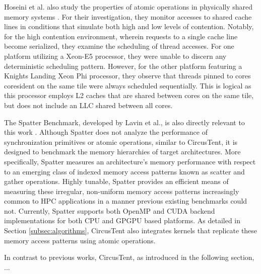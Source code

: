 Hoseini et al. also study the properties of atomic operations in physically shared memory systems \cite{hoseini2019modeling}.
For their investigation, they monitor accesses to shared cache lines in conditions that simulate both high and low levels of contention.
Notably, for the high contention environment, wherein requests to a single cache line become serialized, they examine the scheduling of thread accesses.
For one platform utilizing a Xeon-E5 processor, they were unable to discern any deterministic scheduling pattern.
However, for the other platform featuring a Knights Landing Xeon Phi processor, they observe that threads pinned to cores coresident on the same tile were always scheduled sequentially.
This is logical as this processor employs L2 caches that are shared between cores on the same tile, but does not include an LLC shared between all cores.

The Spatter Benchmark, developed by Lavin et al., is also directly relevant to this work \cite{lavin2018spatter}.
Although Spatter does not analyze the performance of synchronization primitives or atomic operations, similar to CircusTent, it is designed to benchmark the memory hierarchies of target architectures.
More specifically, Spatter measures an architecture's memory performance with respect to an emerging class of indexed memory access patterns known as scatter and gather operations.
Highly tunable, Spatter provides an efficient means of measuring these irregular, non-uniform memory access patterns increasingly common to HPC applications in a manner previous existing benchmarks could not.
Currently, Spatter supports both OpenMP and CUDA backend implementations for both CPU and GPGPU based platforms.
As detailed in Section \ref{subsec:algorithms}, CircusTent also integrates kernels that replicate these memory access patterns using atomic operations. 

In contrast to previous works, CircusTent, as introduced in the following section, ...


